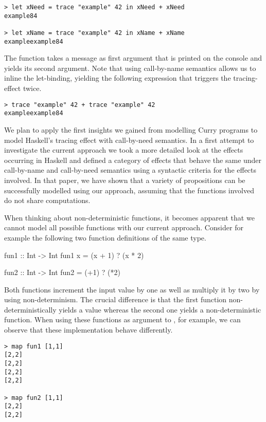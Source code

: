 \begin{verbatim}
> let xNeed = trace "example" 42 in xNeed + xNeed
example84

> let xName = trace "example" 42 in xName + xName
exampleexample84
\end{verbatim}

The function  takes a message as first argument that is printed on the console and yields its second argument.
Note that using call\--by\--name semantics allows us to inline the let\--binding, yielding the following expression that triggers the tracing\--effect twice.

\begin{verbatim}
> trace "example" 42 + trace "example" 42
exampleexample84
\end{verbatim}

We plan to apply the first insights we gained from modelling Curry programs to model Haskell's tracing effect with call\--by\--need semantics.
In a first attempt to investigate the current approach \citep{christiansen2019verifying} we took a more detailed look at the effects occurring in Haskell and defined a category of effects that behave the same under call\--by\--name and call\--by\--need semantics using a syntactic criteria for the effects involved.
In that paper, we have shown that a variety of propositions can be successfully modelled using our approach, assuming that the functions involved do not share computations.

When thinking about non\--deterministic functions, it becomes apparent that we cannot model all possible functions with our current approach.
Consider for example the following two function definitions of the same type.

\begin{curry}
fun1 :: Int -> Int
fun1 x = (x + 1) ? (x * 2)

fun2 :: Int -> Int
fun2 = (+1) ? (*2)
\end{curry}

Both functions increment the input value by one as well as multiply it by two by using non\--determinism.
The crucial difference is that the first function non\--deterministically yields a value whereas the second one yields a non\--deterministic function.
When using these functions as argument to , for example, we can observe that these implementation behave differently.

\begin{verbatim}
> map fun1 [1,1]
[2,2]
[2,2]
[2,2]
[2,2]

> map fun2 [1,1]
[2,2]
[2,2]
\end{verbatim}

